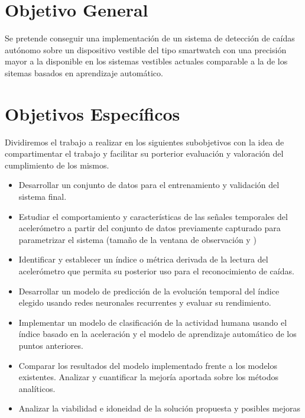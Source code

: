 \documentclass[../tfm.tex]{subfiles}
\begin{document}



\section{Objetivo General}

Se pretende conseguir una implementación de un sistema de detección de caídas autónomo sobre un dispositivo vestible del tipo smartwatch con una precisión mayor a la disponible en los sistemas vestibles actuales comparable a la de los sitemas basados en aprendizaje automático.

\section{Objetivos Específicos}

Dividiremos el trabajo a realizar en los siguientes subobjetivos con la idea de compartimentar el trabajo y facilitar su porterior evaluación y valoración del cumplimiento de los mismos.

\begin{itemize}
  \item Desarrollar un conjunto de datos para el entrenamiento y validación del sistema final.
  \item Estudiar el comportamiento y características de las señales temporales del acelerómetro a partir del conjunto de datos previamente capturado para parametrizar el sistema (tamaño de la ventana de observación y )
  \item Identificar y establecer un índice o métrica derivada de la lectura del acelerómetro que permita su posterior uso para el reconocimiento de caídas.
  \item Desarrollar un modelo de predicción de la evolución temporal del índice elegido usando redes neuronales recurrentes y evaluar su rendimiento.
  \item Implementar un modelo de clasificación de la actividad humana usando el índice basado en la aceleración y el modelo de aprendizaje automático de los puntos anteriores.
  \item Comparar los resultados del modelo implementado frente a los modelos existentes. Analizar y cuantificar la mejoría aportada sobre los métodos analíticos.
  \item Analizar la viabilidad e idoneidad de la solución propuesta y posibles mejoras
\end{itemize}
\end{document}
